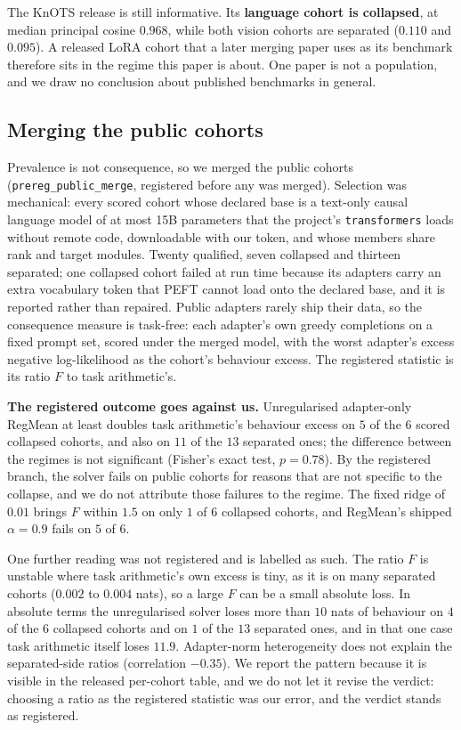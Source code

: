 The KnOTS release is still informative. Its \textbf{language cohort is
collapsed}, at median principal cosine $0.968$, while both vision cohorts are
separated ($0.110$ and $0.095$). A released LoRA cohort that a later merging
paper uses as its benchmark therefore sits in the regime this paper is about.
One paper is not a population, and we draw no conclusion about published
benchmarks in general.

\subsection{Merging the public cohorts}
\label{subsec:public-merge}

Prevalence is not consequence, so we merged the public cohorts
(\texttt{prereg\_public\_merge}, registered before any was merged). Selection
was mechanical: every scored cohort whose declared base is a text-only causal
language model of at most 15B parameters that the project's
\texttt{transformers} loads without remote code, downloadable with our token,
and whose members share rank and target modules. Twenty qualified, seven
collapsed and thirteen separated; one collapsed cohort failed at run time
because its adapters carry an extra vocabulary token that PEFT cannot load onto
the declared base, and it is reported rather than repaired. Public adapters
rarely ship their data, so the consequence measure is task-free: each adapter's
own greedy completions on a fixed prompt set, scored under the merged model,
with the worst adapter's excess negative log-likelihood as the cohort's
behaviour excess. The registered statistic is its ratio $F$ to task
arithmetic's.

\textbf{The registered outcome goes against us.} Unregularised adapter-only
RegMean at least doubles task arithmetic's behaviour excess on $5$ of the $6$
scored collapsed cohorts, and also on $11$ of the $13$ separated ones; the
difference between the regimes is not significant (Fisher's exact test,
$p = 0.78$). By the registered branch, the solver fails on public cohorts for
reasons that are not specific to the collapse, and we do not attribute those
failures to the regime. The fixed ridge of $0.01$ brings $F$ within $1.5$ on
only $1$ of $6$ collapsed cohorts, and RegMean's shipped $\alpha = 0.9$ fails on
$5$ of $6$.

One further reading was not registered and is labelled as such. The ratio
$F$ is unstable where task arithmetic's own excess is tiny, as it is on many
separated cohorts ($0.002$ to $0.004$ nats), so a large $F$ can be a small
absolute loss. In absolute terms the unregularised solver loses more than
$10$ nats of behaviour on $4$ of the $6$ collapsed cohorts and on $1$ of the
$13$ separated ones, and in that one case task arithmetic itself loses $11.9$.
Adapter-norm heterogeneity does not explain the separated-side ratios
(correlation $-0.35$). We report the pattern because it is visible in the
released per-cohort table, and we do not let it revise the verdict: choosing a
ratio as the registered statistic was our error, and the verdict stands as
registered.

